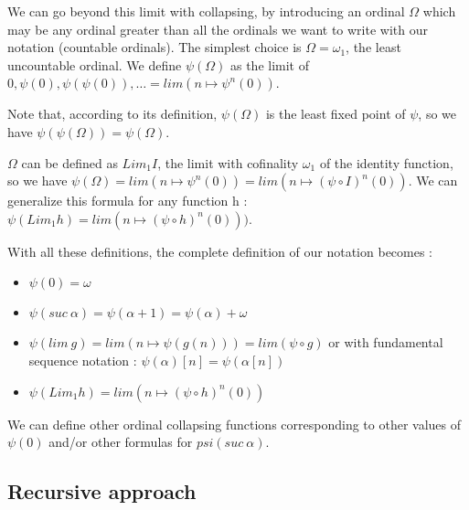\documentclass[10pt]{article}
\begin{document}
We can go beyond this limit with collapsing, by introducing an ordinal \( \Omega \) which may be any ordinal greater than all the ordinals we want to write with our notation (countable ordinals). The simplest choice is \( \Omega = \omega_1 \), the least uncountable ordinal. 
We define \( \psi(\Omega) \) as the limit of \( 0, \psi(0), \psi(\psi(0)), \ldots = lim (n \mapsto \psi^n(0)) \).
\begin{comment}
, and more generally \( \psi(Lim_1 h) = lim (n \mapsto (\psi \circ h)^n(0))) \).
\end{comment}

Note that,  according to its definition, \( \psi(\Omega) \) is the least fixed point of \( \psi \), so we have \( \psi(\psi(\Omega)) = \psi(\Omega) \).

\( \Omega \) can be defined as \( Lim_1 I \), the limit with cofinality \( \omega_1 \) of the identity function, so we have \( \psi(\Omega) = lim (n \mapsto \psi^n(0)) = lim (n \mapsto (\psi \circ I)^n(0)) \).
We can generalize this formula for any function h :
\( \psi(Lim_1 h) = lim (n \mapsto (\psi \circ h)^n(0))) \).

With all these definitions, the complete definition of our notation becomes :


\begin{itemize}
     \setlength{\itemsep}{1pt}
     \setlength{\parskip}{0pt}
     \setlength{\parsep}{0pt}

\item \( \psi(0) = \omega  \)

\item \( \psi(suc\ \alpha) = \psi(\alpha+1) = \psi(\alpha) + \omega \) 

\item \( \psi(lim\ g) = lim (n \mapsto \psi(g(n))) = lim(\psi \circ g) \)  
 or with fundamental sequence notation : \( \psi(\alpha)[n] = \psi(\alpha[n]) \)

\item \( \psi(Lim_1 h) = lim (n \mapsto (\psi \circ h)^n(0)) \) 

\end{itemize}


\bigskip

We can define other ordinal collapsing functions corresponding to other values of \( \psi(0) \) and/or other formulas for \( psi(suc\ \alpha) \).


\subsection{Recursive approach}
\end{document}
